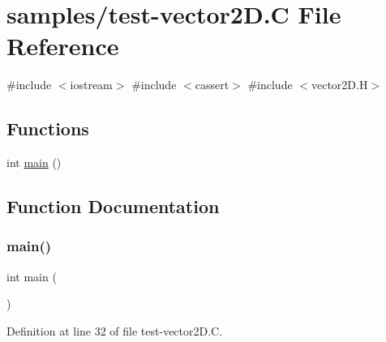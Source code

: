 \hypertarget{test-vector2_d_8_c}{}\section{samples/test-\/vector2D.C File Reference}
\label{test-vector2_d_8_c}
{\ttfamily \#include $<$iostream$>$}\newline
{\ttfamily \#include $<$cassert$>$}\newline
{\ttfamily \#include $<$vector2\+D.\+H$>$}\newline
\subsection*{Functions}
\begin{DoxyCompactItemize}
\item 
int \hyperlink{test-vector2_d_8_c_ae66f6b31b5ad750f1fe042a706a4e3d4}{main} ()
\end{DoxyCompactItemize}


\subsection{Function Documentation}
\mbox{\label{test-vector2_d_8_c_ae66f6b31b5ad750f1fe042a706a4e3d4}} 
\subsubsection{\texorpdfstring{main()}{main()}}
{\footnotesize\ttfamily int main (\begin{DoxyParamCaption}{ }\end{DoxyParamCaption})}



Definition at line 32 of file test-\/vector2\+D.\+C.

